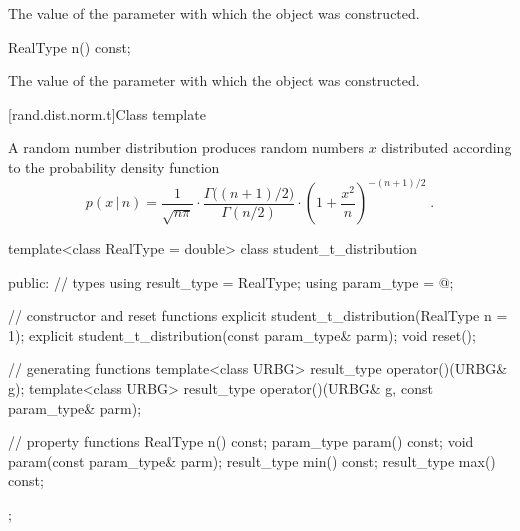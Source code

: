 \begin{itemdescr}
\pnum\returns The value of the  parameter
 with which the object was constructed.
\end{itemdescr}

%
\begin{itemdecl}
RealType n() const;
\end{itemdecl}

\begin{itemdescr}
\pnum\returns The value of the  parameter
 with which the object was constructed.
\end{itemdescr}


[rand.dist.norm.t]{Class template }%
%
%

\pnum
A  random number distribution
produces random numbers $x$
distributed according to
the probability density function%
%
%
\[%
 p(x\,|\,n)
      =  \frac{1}
              {\sqrt{n \pi}}
         \cdot \frac{\Gamma\big((n+1)/2\big)}
                    {\Gamma(n/2)}
         \cdot \left( 1+\frac{x^2}{n} \right) ^ {-(n+1)/2}
\; \mbox{.}
\]

%
\begin{codeblock}
template<class RealType = double>
 class student_t_distribution
{
public:
 // types
 using result_type = RealType;
 using param_type  = @\unspec@;

 // constructor and reset functions
 explicit student_t_distribution(RealType n = 1);
 explicit student_t_distribution(const param_type& parm);
 void reset();

 // generating functions
 template<class URBG>
   result_type operator()(URBG& g);
 template<class URBG>
   result_type operator()(URBG& g, const param_type& parm);

 // property functions
 RealType n() const;
 param_type param() const;
 void param(const param_type& parm);
 result_type min() const;
 result_type max() const;
};
\end{codeblock}


